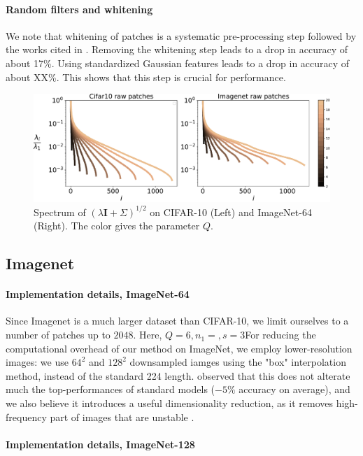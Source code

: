 \documentclass{article}
\begin{document}
{\paragraph{Random filters and whitening} We note that whitening of patches is a systematic pre-processing step followed by the works cited in \cite{}.
Removing the whitening step leads to a drop in accuracy of about 17\%.
Using standardized Gaussian features leads to a drop in accuracy of about XX\%. This shows that this step is crucial for performance.


\begin{figure}
  \includegraphics[width=1.\linewidth]{figures/spectrum_patches}
  \caption{Spectrum of $(\lambda \mathbf{I}+\Sigma)^{1/2}$ on CIFAR-10 (Left) and ImageNet-64 (Right).\label{dico} The color gives the parameter $Q$.}
\end{figure}
\subsection{Imagenet}

\paragraph{Implementation details, ImageNet-64}  Since Imagenet is a much larger dataset than CIFAR-10, we limit ourselves to a number of patches up to $2048$. Here, $Q=6, n_1=, s=3$For reducing the computational overhead of our method on ImageNet, we employ lower-resolution images: we use $64^2$ and $128^2$ downsampled iamges using the "box" interpolation method, instead of the standard 224 length.  \cite{DBLP:journals/corr/ChrabaszczLH17} observed that this does not alterate much the top-performances of standard models ($-5 \%$ accuracy on average), and we also believe it introduces a useful dimensionality reduction, as it removes high-frequency part of images that are unstable \citet{chjdq}.

\paragraph{Implementation details, ImageNet-128}

}
\end{document}
